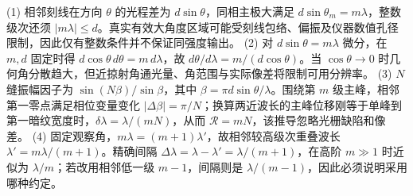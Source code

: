 (1) 相邻刻线在方向 \(\theta\) 的光程差为 \(d\sin\theta\)，同相主极大满足 \(d\sin\theta_m=m\lambda\)，整数级次还须 \(|m\lambda|\le d\)。真实有效大角度区域可能受刻线包络、偏振及仪器数值孔径限制，因此仅有整数条件并不保证同强度输出。
(2) 对 \(d\sin\theta=m\lambda\) 微分，在 \(m,d\) 固定时得 \(d\cos\theta\,d\theta=m\,d\lambda\)，故 \(d\theta/d\lambda=m/(d\cos\theta)\)。当 \(\cos\theta\to0\) 时几何角分散趋大，但近掠射角通光量、角范围与实际像差将限制可用分辨率。
(3) \(N\) 缝振幅因子为 \(\sin(N\beta)/\sin\beta\)，其中 \(\beta=\pi d\sin\theta/\lambda\)。围绕第 \(m\) 级主峰，相邻第一零点满足相位变量变化 \(|\Delta\beta|=\pi/N\)；换算两近波长的主峰位移刚等于单峰到第一暗纹宽度时，\(\delta\lambda=\lambda/(mN)\)，从而 \(\mathcal R=mN\)，该推导忽略光栅缺陷和像差。
(4) 固定观察角，\(m\lambda=(m+1)\lambda'\)，故相邻较高级次重叠波长 \(\lambda'=m\lambda/(m+1)\)。精确间隔 \(\Delta\lambda=\lambda-\lambda'=\lambda/(m+1)\)，在高阶 \(m\gg1\) 时近似为 \(\lambda/m\)；若改用相邻低一级 \(m-1\)，间隔则是 \(\lambda/(m-1)\)，因此必须说明采用哪种约定。
